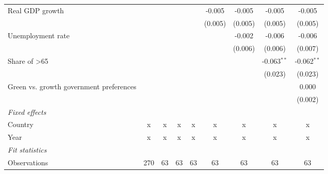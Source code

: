\begin{table}[htbp]
\begin{tabular}{lcccccccc}
      Real GDP growth                                                          &         &         &                &                & -0.005         & -0.005         & -0.005         & -0.005\\   
                                                                               &         &         &                &                & (0.005)        & (0.005)        & (0.005)        & (0.005)\\   
      Unemployment rate                                                        &         &         &                &                &                & -0.002         & -0.006         & -0.006\\   
                                                                               &         &         &                &                &                & (0.006)        & (0.006)        & (0.007)\\   
      Share of >65                                                             &         &         &                &                &                &                & -0.063$^{**}$  & -0.062$^{**}$\\   
                                                                               &         &         &                &                &                &                & (0.023)        & (0.023)\\   
      Green vs. growth government preferences                                  &         &         &                &                &                &                &                & 0.000\\   
                                                                               &         &         &                &                &                &                &                & (0.002)\\   
      \emph{Fixed effects}\\
      Country                                                                  & x       & x       & x              & x              & x              & x              & x              & x\\  
      Year                                                                     & x       & x       & x              & x              & x              & x              & x              & x\\  
      \midrule \emph{Fit statistics}\\
      Observations                                                             & 270     & 63      & 63             & 63             & 63             & 63             & 63             & 63\\  

\end{tabular}
\end{table}
